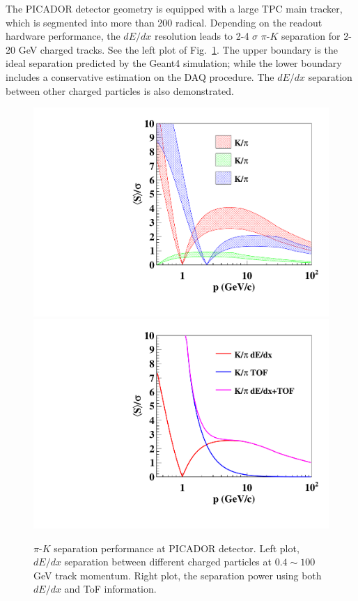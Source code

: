 The PICADOR detector geometry is equipped with a large TPC main tracker, which is segmented into more than 200 radical.
Depending on the readout hardware performance,
the $dE/dx$ resolution leads to 2-4 $\sigma$ $\pi$-$K$ separation for 2-20 GeV charged tracks.
See the left plot of Fig.~\ref{fig:dedx}. The upper boundary is the ideal separation predicted by the Geant4 simulation;
while the lower boundary includes a conservative estimation on the DAQ procedure.
The $dE/dx$ separation between other charged particles is also demonstrated. 

\begin{figure}[h!]
\centering
\includegraphics[scale=0.55]{Figures/Performance/anff/sep2p}
\includegraphics[scale=0.55]{Figures/Performance/anff/sep2p_tof}
\caption{$\pi$-$K$ separation performance at PICADOR detector.
  Left plot, $dE/dx$ separation between different charged particles at $0.4\sim 100$ GeV track momentum.
  Right plot, the separation power using both $dE/dx$ and ToF information.}
\label{fig:dedx}
\end{figure}


